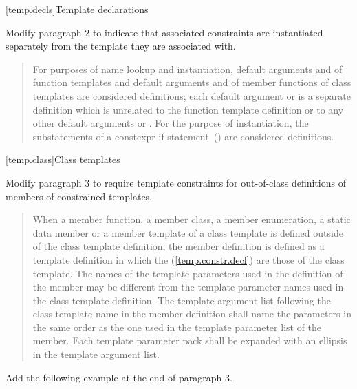 \setcounter{section}{4}
[temp.decls]{Template declarations}

Modify paragraph 2 to indicate that associated constraints are
instantiated separately from the template they are associated with.

\begin{quote}
\setcounter{Paras}{1}
\pnum
For purposes of name lookup and instantiation,
default arguments and 
 of function templates and 
default arguments and 
 of member functions of class templates 
are considered definitions;
each default argument or 
 is a separate definition which is unrelated to
the function template definition or to any other default arguments or
.
For the purpose of instantiation, the substatements of a constexpr if
statement~() are considered definitions.
\end{quote}


[temp.class]{Class templates}

Modify paragraph 3 to require template constraints for out-of-class
definitions of members of constrained templates. 

\begin{quote}
\setcounter{Paras}{2}
\pnum
When a member function, a member class, a member enumeration, a static 
data member or a member template of a class template is defined outside 
of the class template definition, the member definition is defined as a 
template definition in which the 
 (\ref{temp.constr.decl}) are those of 
the class template.
% 
The names of the template parameters used in the definition of the 
member may be different from the template parameter names used in the 
class template definition. The template argument list following the class
template name in the member definition shall name the parameters in the 
same order as the one used in the template parameter list of the member. 
% 
Each template parameter pack shall be expanded with an ellipsis in the 
template argument list.
\end{quote}

Add the following example at the end of paragraph 3.

